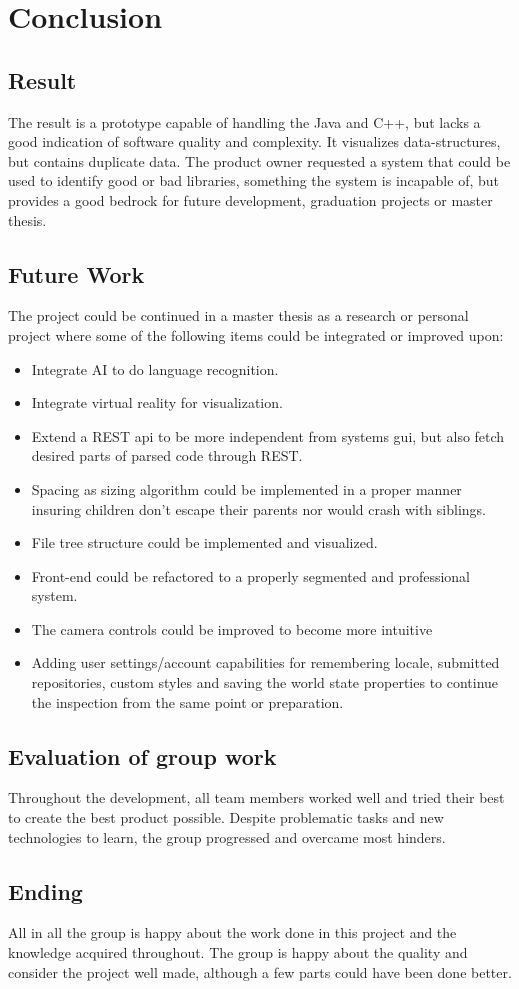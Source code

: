 \chapter{Conclusion}
\label{chap:conclusion}
\section{Result}
The result is a prototype capable of handling the Java and C++, but lacks a good indication of software quality and complexity. It visualizes data-structures, but contains duplicate data. The product owner requested a system that could be used to identify good or bad libraries, something the system is incapable of, but provides a good bedrock for future development, graduation projects or master thesis.

\section{Future Work}
\label{sec:future}
The project could be continued in a master thesis as a research or personal project where some of the following items could be integrated or improved upon:

\begin{itemize}
    \item Integrate AI to do language recognition.
    \item Integrate virtual reality for visualization.
    \item Extend a REST \gls{api} to be more independent from systems \gls{gui}, but also fetch desired parts of parsed code through REST.
    \item Spacing as sizing algorithm could be implemented in a proper manner insuring children don't escape their parents nor would crash with siblings.
    \item File tree structure could be implemented and visualized.
    \item Front-end could be refactored to a properly segmented and professional system.
    \item The camera controls could be improved to become more intuitive
    \item Adding user settings/account capabilities for remembering locale, submitted repositories, custom styles and saving the world state properties to continue the inspection from the same point or preparation.
\end{itemize}

\section{Evaluation of group work}
Throughout the development, all team members worked well and tried their best to create the best product possible. Despite problematic tasks and new technologies to learn, the group progressed and overcame most hinders.

\section{Ending}
All in all the group is happy about the work done in this project and the knowledge acquired throughout. The group is happy about the quality and consider the project well made, although a few parts could have been done better.